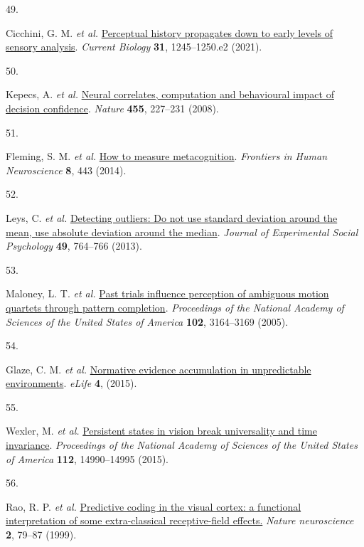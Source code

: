 \documentclass[
]{article}
\newlength{\cslhangindent}
\newlength{\csllabelwidth}
\newlength{\cslentryspacingunit} %
\newenvironment{CSLReferences}[2] %
 {%
  \setlength{\parindent}{0pt}
  \ifodd #1
  \let\oldpar\par
  \def\par{\hangindent=\cslhangindent\oldpar}
  \fi
  \setlength{\parskip}{#2\cslentryspacingunit}
 }%
 {}
\newcommand{\CSLLeftMargin}[1]{\parbox[t]{\csllabelwidth}{#1}}
\newcommand{\CSLRightInline}[1]{\parbox[t]{\linewidth - \csllabelwidth}{#1}\break}
\begin{document}
\begin{CSLReferences}{0}{0}
\leavevmode{}%
\CSLLeftMargin{49. }%
\CSLRightInline{Cicchini, G. M. \emph{et al.}
\href{https://doi.org/10.1016/j.cub.2020.12.004}{{Perceptual history
propagates down to early levels of sensory analysis}}. \emph{Current
Biology} \textbf{31}, 1245--1250.e2 (2021).}

\leavevmode{}%
\CSLLeftMargin{50. }%
\CSLRightInline{Kepecs, A. \emph{et al.}
\href{https://doi.org/10.1038/nature07200}{{Neural correlates,
computation and behavioural impact of decision confidence}}.
\emph{Nature} \textbf{455}, 227--231 (2008).}

\leavevmode{}%
\CSLLeftMargin{51. }%
\CSLRightInline{Fleming, S. M. \emph{et al.}
\href{https://doi.org/10.3389/fnhum.2014.00443}{{How to measure
metacognition}}. \emph{Frontiers in Human Neuroscience} \textbf{8}, 443
(2014).}

\leavevmode{}%
\CSLLeftMargin{52. }%
\CSLRightInline{Leys, C. \emph{et al.}
\href{https://doi.org/10.1016/J.JESP.2013.03.013}{{Detecting outliers:
Do not use standard deviation around the mean, use absolute deviation
around the median}}. \emph{Journal of Experimental Social Psychology}
\textbf{49}, 764--766 (2013).}

\leavevmode{}%
\CSLLeftMargin{53. }%
\CSLRightInline{Maloney, L. T. \emph{et al.}
\href{https://doi.org/10.1073/pnas.0407157102}{{Past trials influence
perception of ambiguous motion quartets through pattern completion}}.
\emph{Proceedings of the National Academy of Sciences of the United
States of America} \textbf{102}, 3164--3169 (2005).}

\leavevmode{}%
\CSLLeftMargin{54. }%
\CSLRightInline{Glaze, C. M. \emph{et al.}
\href{https://doi.org/10.7554/eLife.08825}{{Normative evidence
accumulation in unpredictable environments}}. \emph{eLife} \textbf{4},
(2015).}

\leavevmode{}%
\CSLLeftMargin{55. }%
\CSLRightInline{Wexler, M. \emph{et al.}
\href{https://doi.org/10.1073/pnas.1508847112}{{Persistent states in
vision break universality and time invariance}}. \emph{Proceedings of
the National Academy of Sciences of the United States of America}
\textbf{112}, 14990--14995 (2015).}

\leavevmode{}%
\CSLLeftMargin{56. }%
\CSLRightInline{Rao, R. P. \emph{et al.}
\href{https://doi.org/10.1038/4580}{{Predictive coding in the visual
cortex: a functional interpretation of some extra-classical
receptive-field effects.}} \emph{Nature neuroscience} \textbf{2}, 79--87
(1999).}


\end{CSLReferences}
\end{document}
